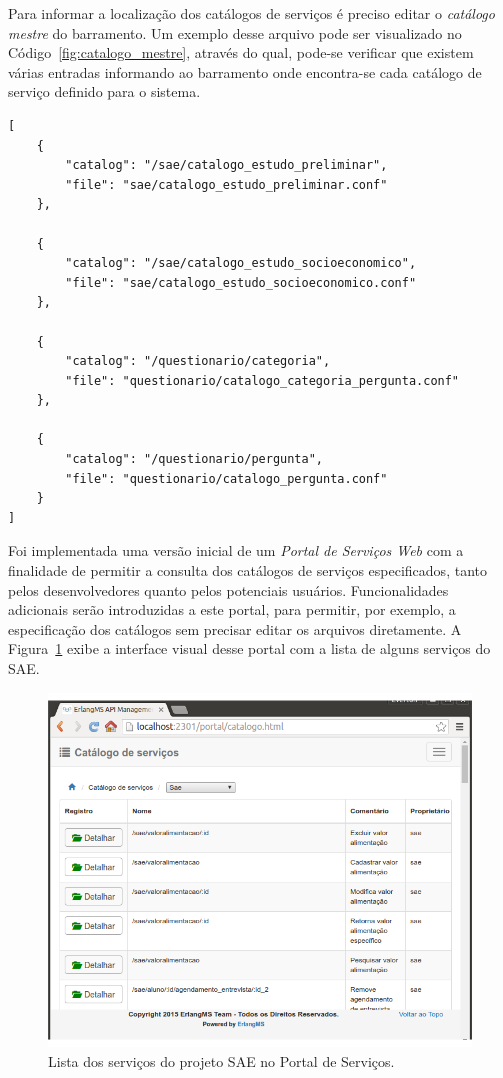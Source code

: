 Para informar a localização dos 
catálogos de serviços
é preciso editar o
\emph{catálogo mestre} do barramento. 
Um exemplo desse arquivo 
pode ser visualizado no 
Código~\ref{fig:catalogo_mestre},
através do qual, pode-se verificar que 
existem várias entradas 
informando ao barramento onde encontra-se
cada catálogo de serviço definido para o sistema.


\renewcommand{\lstlistingname}{Código}             
\begin{lstlisting}[caption=Exemplo do catálogo mestre do projeto SAE., label=fig:catalogo_mestre] 
[
	{
		"catalog": "/sae/catalogo_estudo_preliminar", 
		"file": "sae/catalogo_estudo_preliminar.conf"
	},
	
	{
		"catalog": "/sae/catalogo_estudo_socioeconomico", 
		"file": "sae/catalogo_estudo_socioeconomico.conf"
	},
	
	{
		"catalog": "/questionario/categoria", 
		"file": "questionario/catalogo_categoria_pergunta.conf"
	},

	{
		"catalog": "/questionario/pergunta", 
		"file": "questionario/catalogo_pergunta.conf"
	}
]
\end{lstlisting}


Foi implementada uma versão inicial de um \emph{Portal de Serviços Web} 
com a finalidade de
permitir a consulta dos catálogos de 
serviços especificados, 
tanto pelos desenvolvedores quanto pelos 
potenciais usuários.
Funcionalidades adicionais serão 
introduzidas a este portal, para permitir, 
por exemplo,
a especificação dos catálogos sem precisar editar 
os arquivos diretamente. 
A Figura~\ref{fig:portal_servicos}
exibe a interface visual desse portal
com a lista de alguns serviços do \acrshort{SAE}.

\begin{figure}[htb]
\centering
\includegraphics[scale=0.6]{img/processo/portal.png}
\caption{Lista dos serviços do projeto SAE no Portal de Serviços.}
\label{fig:portal_servicos}
\end{figure}






